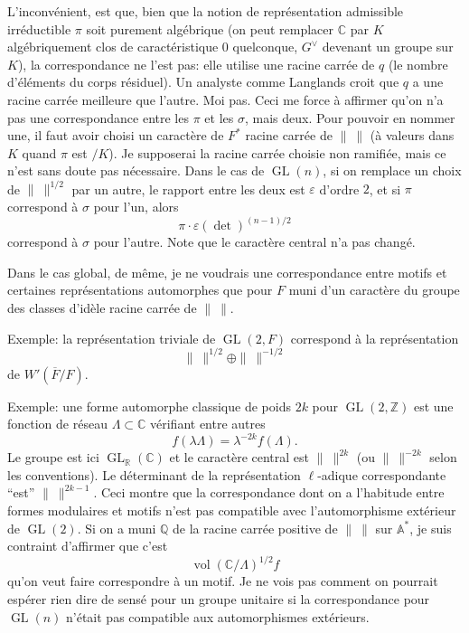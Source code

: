 \documentclass[11pt]{article}
\newcommand{\GL}{\operatorname{GL}}
\newcommand{\vol}{\operatorname{vol}}
\newcommand{\Fbar}{\overline F}
\newcommand{\normchar}{\|\ \|}
\begin{document}
L'inconvénient, est que, bien que la notion de représentation admissible irréductible \(\pi\) soit purement algébrique (on peut remplacer \(\mathbb C\) par \(K\) algébriquement clos de caractéristique \(0\) quelconque, \(G^\vee\) devenant un groupe sur \(K\)), la correspondance ne l'est pas: elle utilise une racine carrée de \(q\) (le nombre d'éléments du corps résiduel). Un analyste comme Langlands croit que \(q\) a une racine carrée meilleure que l'autre. Moi pas. Ceci me force à affirmer qu'on n'a pas une correspondance entre les \(\pi\) et les \(\sigma\), mais deux. Pour pouvoir en nommer une, il faut avoir choisi un caractère de \(F^\ast\) racine carrée de \(\normchar\) (à valeurs dans \(K\) quand \(\pi\) est \(/K\)). Je supposerai la racine carrée choisie non ramifiée, mais ce n'est sans doute pas nécessaire. Dans le cas de \(\GL(n)\), si on remplace un choix de \(\normchar^{1/2}\) par un autre, le rapport entre les deux est \(\varepsilon\) d'ordre \(2\), et si \(\pi\) correspond à \(\sigma\) pour l'un, alors
\[
\pi\cdot\varepsilon(\det)^{(n-1)/2}
\]
correspond à \(\sigma\) pour l'autre. Note que le caractère central n'a pas changé.

Dans le cas global, de même, je ne voudrais une correspondance entre motifs et certaines représentations automorphes que pour \(F\) muni d'un caractère du groupe des classes d'idèle racine carrée de \(\normchar\).

Exemple: la représentation triviale de \(\GL(2,F)\) correspond à la représentation
\[
\normchar^{1/2}\oplus\normchar^{-1/2}
\]
de \(W'(\Fbar/F)\).

Exemple: une forme automorphe classique de poids \(2k\) pour \(\GL(2,\mathbb Z)\) est une fonction de réseau \(\Lambda\subset\mathbb C\) vérifiant entre autres
\[
f(\lambda\Lambda)=\lambda^{-2k}f(\Lambda).
\]
Le groupe est ici \(\GL_{\mathbb R}(\mathbb C)\) et le caractère central est \(\normchar^{2k}\) (ou \(\normchar^{-2k}\) selon les conventions). Le déterminant de la représentation \(\ell\)-adique correspondante ``est'' \(\normchar^{2k-1}\). Ceci montre que la correspondance dont on a l'habitude entre formes modulaires et motifs n'est pas compatible avec l'automorphisme extérieur de \(\GL(2)\). Si on a muni \(\mathbb Q\) de la racine carrée positive de \(\normchar\) sur \(\mathbb A^\ast\), je suis contraint d'affirmer que c'est
\[
\vol(\mathbb C/\Lambda)^{1/2}f
\]
qu'on veut faire correspondre à un motif. Je ne vois pas comment on pourrait espérer rien dire de sensé pour un groupe unitaire si la correspondance pour \(\GL(n)\) n'était pas compatible aux automorphismes extérieurs.
\end{document}
